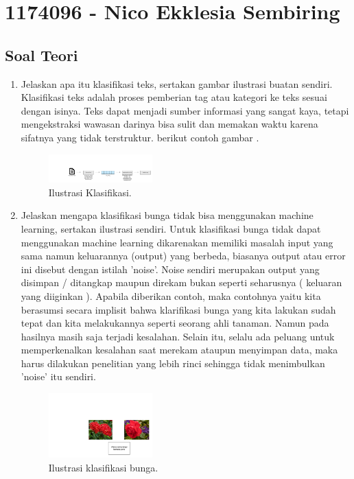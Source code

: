 \section{1174096 - Nico Ekklesia Sembiring}
\subsection{Soal Teori}
\begin{enumerate}

	\item Jelaskan apa itu klasifikasi teks, sertakan gambar ilustrasi buatan sendiri.
	\hfill\break
	Klasiﬁkasi teks adalah proses pemberian tag atau kategori ke teks sesuai dengan isinya. Teks dapat menjadi sumber informasi yang sangat kaya, tetapi mengekstraksi wawasan darinya bisa sulit dan memakan waktu karena sifatnya yang tidak terstruktur. berikut contoh gambar .
	
    \begin{figure}[H]
	\centering
		\includegraphics[width=4cm]{figures/1174096/tugas4/1.PNG}
		\caption{Ilustrasi Klasiﬁkasi.}
	\end{figure}

	\item Jelaskan mengapa klasifikasi bunga tidak bisa menggunakan machine learning, sertakan ilustrasi sendiri.
	\hfill\break
    Untuk klasiﬁkasi bunga tidak dapat menggunakan machine learning dikarenakan memiliki masalah input yang sama namun keluarannya (output) yang berbeda, biasanya output atau error ini disebut dengan istilah ’noise’. Noise sendiri merupakan output yang disimpan / ditangkap maupun direkam bukan seperti seharusnya ( keluaran yang diiginkan ). Apabila diberikan contoh, maka contohnya yaitu kita berasumsi secara implisit bahwa klariﬁkasi bunga yang kita lakukan sudah tepat dan kita melakukannya seperti seorang ahli tanaman. Namun pada hasilnya masih saja terjadi kesalahan. Selain itu, selalu ada peluang untuk memperkenalkan kesalahan saat merekam ataupun menyimpan data, maka harus dilakukan penelitian yang lebih rinci sehingga tidak menimbulkan ’noise’ itu sendiri.
	
    \begin{figure}[H]
	\centering
		\includegraphics[width=4cm]{figures/1174096/tugas4/2.PNG}
		\caption{Ilustrasi klasifikasi bunga.}
	\end{figure}



\end{enumerate}
